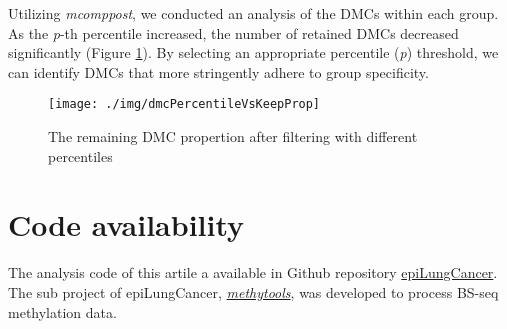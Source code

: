 \documentclass[10pt]{article}
\begin{document}
Utilizing \emph{mcomppost}, we conducted an analysis of the DMCs within each group. As the \textit{p}-th percentile increased, the number of retained DMCs 
decreased significantly (Figure \ref*{fig:dmcPK}). By selecting an appropriate percentile (\textit{p}) threshold, we can identify DMCs that more stringently adhere to 
group specificity.


\begin{figure}[htbp]
    \centering
    \texttt{[image: ./img/dmcPercentileVsKeepProp]}
    \caption{The remaining DMC propertion after filtering with different percentiles}
    \label{fig:dmcPK}
\end{figure}

\section{Code availability}\label{sec:code}

The analysis code of this artile a available in Github repository \href{https://github.com/hcyvan/epiLungCancer}{epiLungCancer}. The
sub project of epiLungCancer, \href{https://github.com/hcyvan/epiLungCancer/tree/main/methytools}{\textit{methytools}},  was developed to process
BS-seq methylation data.





\end{document}
